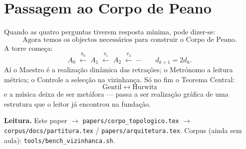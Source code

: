 \documentclass[11pt,a4paper]{article}
\newcommand{\code}[1]{\texttt{\small #1}}
\begin{document}
\section{Passagem ao Corpo de Peano}

Quando as quatro perguntas tiverem resposta mínima, pode dizer-se:
\[
\boxed{
\text{Agora temos os objectos necessários para construir o Corpo de Peano.}
}
\]
A torre começa:
\[
A_0
\;\xleftarrow{\pi_0}\;
A_1
\;\xleftarrow{\pi_1}\;
A_2
\;\xleftarrow{\pi_2}\;
\cdots
\qquad
d_{k+1}=2d_k.
\]
Aí o Maestro é a realização dinâmica das retrações; o Metrónomo a
leitura métrica; o Controle a selecção na vizinhança. Só no fim o
Teorema Central:
\[
\boxed{\text{Gentil}\;\longleftrightarrow\;\text{Hurwitz}}
\]
e a música deixa de ser metáfora --- passa a ser realização gráfica de
uma estrutura que o leitor já encontrou na fundação.

\bigskip
\noindent\textbf{Leitura.} Este paper $\to$
\code{papers/corpo\_topologico.tex} $\to$
\code{corpus/docs/partitura.tex} / \code{papers/arquitetura.tex}.
Corpus (ainda sem aula): \code{tools/bench\_vizinhanca.sh}.
\end{document}
